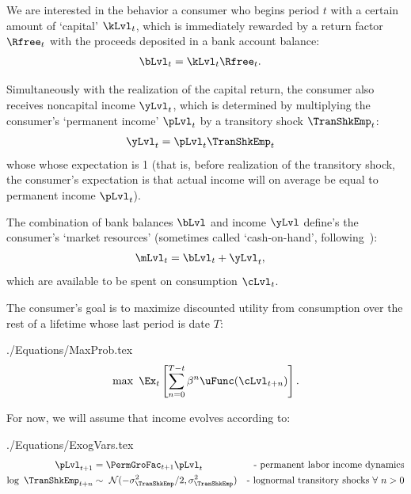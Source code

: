 \documentclass[titlepage, headings=optiontotocandhead]{\econtex}
\begin{document}
We are interested in the behavior a consumer who begins period $t$ with a certain amount of `capital' $\kLvl_{t}$, which is immediately rewarded by a return factor $\Rfree_{t}$ with the proceeds deposited in a bank account balance:
\begin{align}
  \bLvl_{t} & = \kLvl_{t}\Rfree_{t}. \label{eq:bLvl}
\end{align}

Simultaneously with the realization of the capital return, the consumer also receives noncapital income $\yLvl_{t}$, which is determined by multiplying the consumer's `permanent income' $\pLvl_{t}$ by a transitory shock $\TranShkEmp_{t}$:
\begin{align}
  \yLvl_{t} & = \pLvl_{t}\TranShkEmp_{t} \label{eq:yLvl}
\end{align}
whose whose expectation is 1 (that is, before realization of the transitory shock, the consumer's expectation is that actual income will on average be equal to permanent income $\pLvl_{t}$).

The combination of bank balances $\bLvl$ and income $\yLvl$ define's the consumer's `market resources' (sometimes called `cash-on-hand', following~\cite{deatonUnderstandingC}):
\begin{align}
  \mLvl_{t} & = \bLvl_{t}+\yLvl_{t} \label{eq:mLvl}, 
\end{align}
which are available to be spent on consumption $\cLvl_{t}$.  

The consumer's goal is to maximize discounted utility from consumption over the rest of a lifetime whose last period is date $T$:
\begin{verbatimwrite}{./Equations/MaxProb.tex}
  \begin{equation}\label{eq:MaxProb}
    \max ~ \Ex_{t}\left[ \sum_{n=0}^{T-t} {\DiscAlt}^{n} \uFunc({\cLvl}_{t+n})\right].
  \end{equation}
\end{verbatimwrite}
\unskip

For now, we will assume that income evolves according to: 
\begin{verbatimwrite}{./Equations/ExogVars.tex}
  \begin{equation}\begin{gathered}\begin{aligned}
         \pLvl_{t+1}  & = \PermGroFac_{t+1}\pLvl_{t} &   \text{- permanent labor income dynamics} \label{eq:permincgrow} 
        \\ \log ~ \TranShkEmp_{t+n} & \sim ~\mathcal{N}(-\sigma_{\TranShkEmp}^{2}/2,\sigma_{\TranShkEmp}^{2}) & \text{- lognormal transitory shocks}~\forall~n>0 
      \end{aligned}\end{gathered}\end{equation}
\end{verbatimwrite}
\unskip
\end{document}
